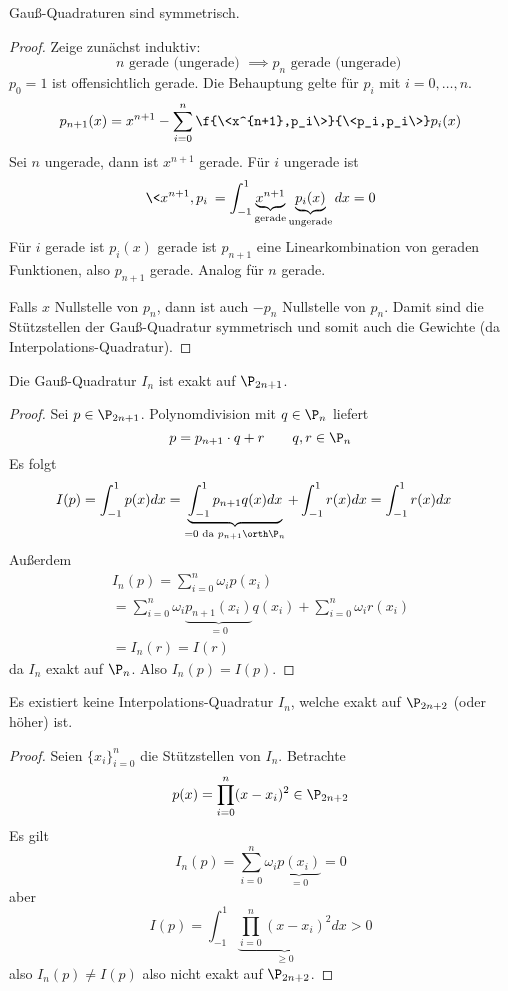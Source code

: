 \documentclass[11pt]{scrartcl}
\begin{document}
\begin{st}[Symmetrie]
	\label{2.20}
	Gauß-Quadraturen sind symmetrisch.
	\begin{proof}
		Zeige zunächst induktiv: 
		\[
			n \text{ gerade (ungerade) } \implies p_n \text{ gerade (ungerade) }
		\]
		$p_0 = 1$ ist offensichtlich gerade.
		Die Behauptung gelte für $p_i$ mit $i=0,\dotsc,n$.
		\[
			p_{n+1}(x) = x^{n+1} - \sum_{i=0}^n \f{\<x^{n+1},p_i\>}{\<p_i,p_i\>} p_i(x)
		\]
		Sei $n$ ungerade, dann ist $x^{n+1}$ gerade.
		Für $i$ ungerade ist
		\[
			\<x^{n+1},p_i\> = \int_{-1}^1 \underbrace{x^{n+1}}_{\text{gerade}} \underbrace{p_i(x)}_{\text{ungerade}} dx = 0
		\]
		Für $i$ gerade ist $p_i(x)$ gerade ist $p_{n+1}$ eine Linearkombination von geraden Funktionen, also $p_{n+1}$ gerade.
		Analog für $n$ gerade.

		Falls $x$ Nullstelle von $p_n$, dann ist auch $-p_n$ Nullstelle von $p_n$.
		Damit sind die Stützstellen der Gauß-Quadratur symmetrisch und somit auch die Gewichte (da Interpolations-Quadratur).
	\end{proof}
\end{st}

\begin{st}[Exaktheit]
	\label{2.21}
	Die Gauß-Quadratur $I_n$ ist exakt auf $\P_{2n+1}$.
	\begin{proof}
		Sei $p\in \P_{2n+1}$.
		Polynomdivision mit $q\in \P_n$ liefert
		\[
			p= p_{n+1} \cdot q + r \qquad  q,r\in \P_n
		\]
		Es folgt
		\begin{align*}
			I(p) 
			&= \int_{-1}^1 p(x) dx 
			= \underbrace{\int_{-1}^1 p_{n+1}q(x) dx}_{=0 \text{ da $p_{n+1}\orth \P_n$}} + \int_{-1}^1 r(x) dx
			= \int_{-1}^1 r(x) dx 
		\end{align*}
		Außerdem
		\begin{align*}
			I_n(p) 
			= \sum_{i=0}^n \omega_i p(x_i) \\
			= \sum_{i=0}^n \omega_i \underbrace{p_{n+1}(x_i)}_{=0} q(x_i) + \sum_{i=0}^n \omega_i r(x_i) \\
			= I_n(r) = I(r)
		\end{align*}
		da $I_n$ exakt auf $\P_n$.
		Also $I_n(p) = I(p)$.
	\end{proof}
\end{st}

\begin{st}
	\label{2.22}
	Es existiert keine Interpolations-Quadratur $I_n$, welche exakt auf $\P_{2n+2}$ (oder höher) ist.
	\begin{proof}
		Seien $\{x_i\}_{i=0}^n$ die Stützstellen von $I_n$.
		Betrachte 
		\[
			p(x) = \prod_{i=0}^n (x-x_i)^2 \in \P_{2n+2}
		\]
		Es gilt
		\[
			I_n(p) = \sum_{i=0}^n \omega_i \underbrace{p(x_i)}_{=0} = 0
		\]
		aber
		\[
			I(p) = \int_{-1}^1 \underbrace{\prod_{i=0}^n (x-x_i)^2 }_{\ge 0} dx > 0
		\]
		also $I_n(p) \neq I(p)$ also nicht exakt auf $\P_{2n+2}$.
	\end{proof}
\end{st}
\end{document}
